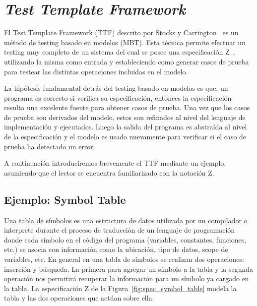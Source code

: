 \chapter{\emph{Test Template Framework}}

El Test Template Framework (TTF) descrito por Stocks y Carrington~\cite{stocks} es un método de testing basado en modelos (MBT). Esta técnica permite efectuar un testing muy completo de un sistema del cual se posee una especificación Z~\cite{spivey}, utilizando la misma como entrada y estableciendo como generar casos de prueba para testear las distintas operaciones incluidas en el modelo.

La hipótesis fundamental detrás del testing basado en modelos es que, un programa es correcto si verifica su especificación, entonces la especificación resulta una excelente fuente para obtener casos de prueba. Una vez que los casos de prueba son derivados del modelo, estos son refinados al nivel del lenguaje de implementación y ejecutados. Luego la salida del programa es abstraída al nivel de la especificación y el modelo es usado nuevamente para verificar si el caso de prueba ha detectado un error. 


A continuación introduciremos brevemente el TTF mediante un ejemplo, asumiendo que el lector se encuentra familiarizado con la notación Z.

\section{Ejemplo: Symbol Table}
\label{sec:ej-symbolTable}

Una tabla de símbolos es una estructura de datos utilizada por un compilador o interprete durante el proceso de traducción de un lenguaje de programación donde cada símbolo en el código del programa (variables, constantes, funciones, etc.) se asocia con información como la ubicación, tipo de datos, scope de variables, etc. 
En general en una tabla de símbolos se realizan dos operaciones: inserción y búsqueda. La primera para agregar un símbolo a la tabla y la segunda operación nos permitirá recuperar la información para un símbolo ya cargado en la tabla.
La especificación Z de la Figura~\ref{fig:spec_symbol_table} modela la tabla y las dos operaciones que actúan sobre ella.

